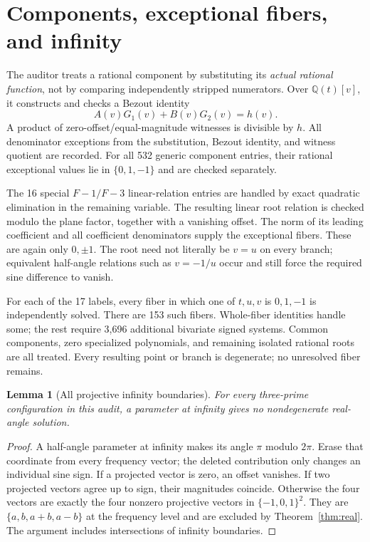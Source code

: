 \documentclass[11pt,letterpaper]{article}
\newtheorem{lemma}[theorem]{Lemma}
\theoremstyle{definition}\newtheorem{definition}[theorem]{Definition}
\theoremstyle{remark}\newtheorem{remark}[theorem]{Remark}
\newcommand{\Q}{\mathbb Q}\newcommand{\Z}{\mathbb Z}\newcommand{\R}{\mathbb R}
\begin{document}
\section{Components, exceptional fibers, and infinity}\label{sec:components}
The auditor treats a rational component by substituting its \emph{actual rational function}, not by comparing independently stripped numerators. Over $\Q(t)[v]$, it constructs and checks a Bezout identity
\[
A(v)G_1(v)+B(v)G_2(v)=h(v).
\]
A product of zero-offset/equal-magnitude witnesses is divisible by $h$. All denominator exceptions from the substitution, Bezout identity, and witness quotient are recorded. For all 532 generic component entries, their rational exceptional values lie in $\{0,1,-1\}$ and are checked separately.

The 16 special $F{-}1/F{-}3$ linear-relation entries are handled by exact quadratic elimination in the remaining variable. The resulting linear root relation is checked modulo the plane factor, together with a vanishing offset. The norm of its leading coefficient and all coefficient denominators supply the exceptional fibers. These are again only $0,\pm1$. The root need not literally be $v=u$ on every branch; equivalent half-angle relations such as $v=-1/u$ occur and still force the required sine difference to vanish.

For each of the 17 labels, every fiber in which one of $t,u,v$ is $0,1,-1$ is independently solved. There are 153 such fibers. Whole-fiber identities handle some; the rest require 3,696 additional bivariate signed systems. Common components, zero specialized polynomials, and remaining isolated rational roots are all treated. Every resulting point or branch is degenerate; no unresolved fiber remains.

\begin{lemma}[All projective infinity boundaries]\label{lem:infinity}
For every three-prime configuration in this audit, a parameter at infinity gives no nondegenerate real-angle solution.
\end{lemma}
\begin{proof}
A half-angle parameter at infinity makes its angle $\pi$ modulo $2\pi$. Erase that coordinate from every frequency vector; the deleted contribution only changes an individual sine sign. If a projected vector is zero, an offset vanishes. If two projected vectors agree up to sign, their magnitudes coincide. Otherwise the four vectors are exactly the four nonzero projective vectors in $\{-1,0,1\}^2$. They are $\{a,b,a+b,a-b\}$ at the frequency level and are excluded by Theorem~\ref{thm:real}. The argument includes intersections of infinity boundaries.
\end{proof}
\end{document}
